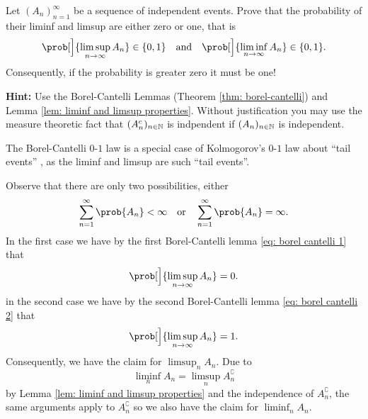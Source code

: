 
\begin{exercise}[subtitle={Borel's \(0\)-\(1\) law \Coffeecup}]
    \label{ex: borel cantelli 0-1 law}
    Let \((A_n)_{n=1}^\infty\) be a sequence of independent events. Prove that 
    the probability of their liminf and limsup are either zero or one, that is
    \[
        \prob[\Big]{\limsup_{n\to \infty} A_n} \in \{0,1\}
        \quad\text{and}\quad
        \prob[\Big]{\liminf_{n\to \infty} A_n} \in \{0,1\}.
    \]
    Consequently, if the probability is greater zero it must be one!

    \noindent\textbf{Hint:} Use the Borel-Cantelli Lemmas (Theorem \ref{thm: borel-cantelli})
    and Lemma \ref{lem: liminf and limsup properties}. Without justification you
    may use the measure theoretic fact that \((A_n^c)_{n\in \mathbb{N}}\)
    is indpendent if \((A_n)_{n\in \mathbb{N}}\) is independent.
    \begin{remark}
        \label{rem: kolmogorov 0-1 law}
        The Borel-Cantelli \(0\)-\(1\) law is a special case of Kolmogorov's \(0\)-\(1\) law
        about ``tail events'' \citep[Thm.~2.37, Cor.~2.38]{klenkeProbabilityTheoryComprehensive2014},
        as the liminf and limsup are such ``tail events''.
    \end{remark}
\end{exercise}

\begin{solution}
    Observe that there are only two possibilities, either
    \[
        \sum_{n=1}^\infty \prob{A_n} < \infty
            \quad\text{or}\quad
        \sum_{n=1}^\infty \prob{A_n} = \infty.
    \]
    In the first case we have by the first Borel-Cantelli lemma \eqref{eq: borel cantelli 1} that
    \[
        \prob[\Big]{\limsup_{n\to \infty} A_n} = 0.
    \]
    in the second case we have by the second Borel-Cantelli lemma \eqref{eq: borel cantelli 2} that
    \[
        \prob[\Big]{\limsup_{n\to \infty} A_n} = 1.
    \]
    Consequently, we have the claim for \(\limsup_n A_n\). Due to
    \[
        \liminf_n A_n = \limsup_n A_n^\complement
    \]
    by Lemma \ref{lem: liminf and limsup properties} and the independence of
    \(A_n^\complement\), the
    same arguments apply to \(A_n^\complement\) so we also have the claim for
    \(\liminf_n A_n\).
    \qedhere
\end{solution}
